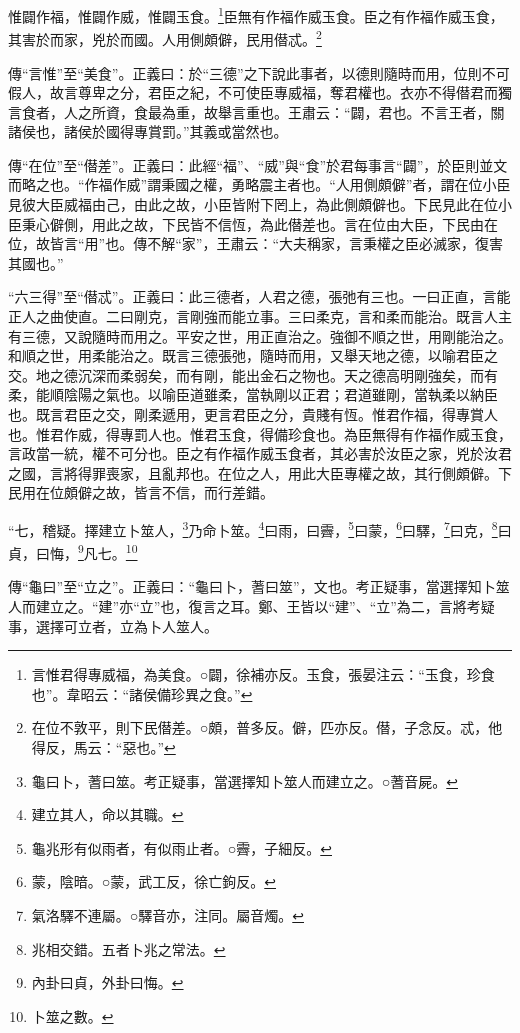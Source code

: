 惟闢作福，惟闢作威，惟闢玉食。\footnote{言惟君得專威福，為美食。○闢，徐補亦反。玉食，張晏注云：“玉食，珍食也”。韋昭云：“諸侯備珍異之食。”}臣無有作福作威玉食。臣之有作福作威玉食，其害於而家，兇於而國。人用側頗僻，民用僣忒。\footnote{在位不敦平，則下民僣差。○頗，普多反。僻，匹亦反。僣，子念反。忒，他得反，馬云：“惡也。”}

{\noindent\zhuan{}\fzbyks 傳“言惟”至“美食”。正義曰：於“三德”之下說此事者，以德則隨時而用，位則不可假人，故言尊卑之分，君臣之紀，不可使臣專威福，奪君權也。衣亦不得僣君而獨言食者，人之所資，食最為重，故舉言重也。王肅云：“闢，君也。不言王者，關諸侯也，諸侯於國得專賞罰。”其義或當然也。 \par}

{\noindent\zhuan{}\fzbyks 傳“在位”至“僣差”。正義曰：此經“福”、“威”與“食”於君每事言“闢”，於臣則並文而略之也。“作福作威”謂秉國之權，勇略震主者也。“人用側頗僻”者，謂在位小臣見彼大臣威福由己，由此之故，小臣皆附下罔上，為此側頗僻也。下民見此在位小臣秉心僻側，用此之故，下民皆不信恆，為此僣差也。言在位由大臣，下民由在位，故皆言“用”也。傳不解“家”，王肅云：“大夫稱家，言秉權之臣必滅家，復害其國也。” \par}

{\noindent\shu{}\fzkt “六三得”至“僣忒”。正義曰：此三德者，人君之德，張弛有三也。一曰正直，言能正人之曲使直。二曰剛克，言剛強而能立事。三曰柔克，言和柔而能治。既言人主有三德，又說隨時而用之。平安之世，用正直治之。強御不順之世，用剛能治之。和順之世，用柔能治之。既言三德張弛，隨時而用，又舉天地之德，以喻君臣之交。地之德沉深而柔弱矣，而有剛，能出金石之物也。天之德高明剛強矣，而有柔，能順陰陽之氣也。以喻臣道雖柔，當執剛以正君；君道雖剛，當執柔以納臣也。既言君臣之交，剛柔遞用，更言君臣之分，貴賤有恆。惟君作福，得專賞人也。惟君作威，得專罰人也。惟君玉食，得備珍食也。為臣無得有作福作威玉食，言政當一統，權不可分也。臣之有作福作威玉食者，其必害於汝臣之家，兇於汝君之國，言將得罪喪家，且亂邦也。在位之人，用此大臣專權之故，其行側頗僻。下民用在位頗僻之故，皆言不信，而行差錯。 \par}

“七，稽疑。擇建立卜筮人，\footnote{龜曰卜，蓍曰筮。考正疑事，當選擇知卜筮人而建立之。○蓍音屍。}乃命卜筮。\footnote{建立其人，命以其職。}曰雨，曰霽，\footnote{龜兆形有似雨者，有似雨止者。○霽，子細反。}曰蒙，\footnote{蒙，陰暗。○蒙，武工反，徐亡鉤反。}曰驛，\footnote{氣洛驛不連屬。○驛音亦，注同。屬音燭。}曰克，\footnote{兆相交錯。五者卜兆之常法。}曰貞，曰悔，\footnote{內卦曰貞，外卦曰悔。}凡七。\footnote{卜筮之數。}


{\noindent\zhuan{}\fzbyks 傳“龜曰”至“立之”。正義曰：“龜曰卜，蓍曰筮”，文也。考正疑事，當選擇知卜筮人而建立之。“建”亦“立”也，復言之耳。鄭、王皆以“建”、“立”為二，言將考疑事，選擇可立者，立為卜人筮人。 \par}

